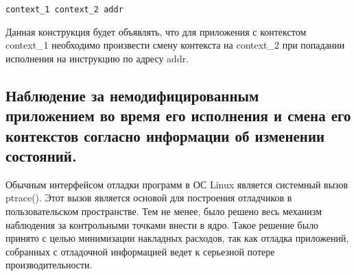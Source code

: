 \bigskip
\begin{lstlisting}
context_1 context_2 addr
\end{lstlisting}

\bigskip
Данная конструкция будет объявлять, что для приложения
с контекстом context\_1 необходимо произвести смену 
контекста на context\_2 при попадании исполнения на 
инструкцию по адресу addr.
\begin{comment}
Проблема наблюдения за данными адресами может быть реализована 
по-разному. Можно использовать вызов ptrace и создавать 
сложную систему методов для наблюдения за событиями в 
наблюдаемом приложении. При этом, обязательно нужно 
следить за такими событиями, как fork и exec для определения, 
в какое состояние переходит приложения. Так же наблюдение за exec 
обеспечит определение факта запуска определенного приложения. Такой 
контроль предлагается осуществлять при помощи системы utrace и 
ее клиента~--- uprobes. Utrace является патчем ядра от Red 
Hat, позволяющим строить отладочные движки, работающие в 
пространстве ядра в качестве загружаемых модулей. Uprobes 
является клиентом utrace и позволяет устанавливать точки 
останова на определенные адреса в коде и для каждой из них 
регистрировать функции-обработчики, которые будут срабатывать ккаждый 
раз, как управление в приложении попадет на одну из точек останова.
\end{comment} 

\bigskip
\subsection{Наблюдение за немодифицированным 
	приложением во время его исполнения 
	и смена его контекстов согласно 
	информации об изменении состояний.}

\bigskip
Обычным интерфейсом отладки программ в ОС Linux является 
системный вызов ptrace(). Этот вызов является основой 
для построения отладчиков в пользовательском пространстве. 
Тем не менее, было решено весь механизм наблюдения 
за контрольными точками внести в ядро. Такое решение 
было принято с целью минимизации накладных расходов, 
так как отладка приложений, собранных с отладочной 
информацией ведет к серьезной потере производительности.

